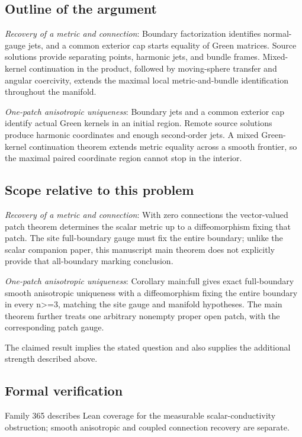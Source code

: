 \documentclass[11pt]{article}
\begin{document}
\subsection{Outline of the argument}
\textit{Recovery of a metric and connection}: Boundary factorization identifies normal-gauge jets, and a common exterior cap starts equality of Green matrices. Source solutions provide separating points, harmonic jets, and bundle frames. Mixed-kernel continuation in the product, followed by moving-sphere transfer and angular coercivity, extends the maximal local metric-and-bundle identification throughout the manifold.

\textit{One-patch anisotropic uniqueness}: Boundary jets and a common exterior cap identify actual Green kernels in an initial region. Remote source solutions produce harmonic coordinates and enough second-order jets. A mixed Green-kernel continuation theorem extends metric equality across a smooth frontier, so the maximal paired coordinate region cannot stop in the interior.

\subsection{Scope relative to this problem}
\textit{Recovery of a metric and connection}: With zero connections the vector-valued patch theorem determines the scalar metric up to a diffeomorphism fixing that patch. The site full-boundary gauge must fix the entire boundary; unlike the scalar companion paper, this manuscript main theorem does not explicitly provide that all-boundary marking conclusion.

\textit{One-patch anisotropic uniqueness}: Corollary main:full gives exact full-boundary smooth anisotropic uniqueness with a diffeomorphism fixing the entire boundary in every n>=3, matching the site gauge and manifold hypotheses. The main theorem further treats one arbitrary nonempty proper open patch, with the corresponding patch gauge.

The claimed result implies the stated question and also supplies the additional strength described above.

\subsection{Formal verification}
Family 365 describes Lean coverage for the measurable scalar-conductivity obstruction; smooth anisotropic and coupled connection recovery are separate.
\end{document}
